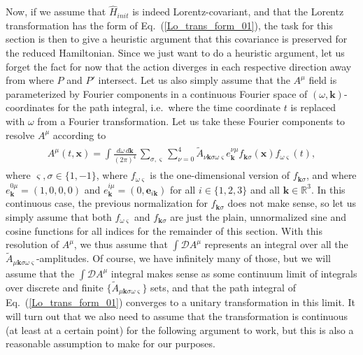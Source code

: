 \documentclass{article}
\begin{document}
Now, if we assume that $\hat H_{init}$ is indeed Lorentz-covariant, and that the Lorentz transformation has the form of Eq.\ (\ref{Lo_trans_form_01}), the task for this section is then to give a heuristic argument that this covariance is preserved for the reduced Hamiltonian. Since we just want to do a heuristic argument, let us forget the fact for now that the action diverges in each respective direction away from where $P$ and $P'$ intersect. Let us also simply assume that the $A^\mu$ field is parameterized by Fourier components in a continuous Fourier space of $(\omega, \mathbf{k})$-coordinates for the path integral, i.e.\ where the time coordinate $t$ is replaced with $\omega$ from a Fourier transformation. 
%
Let us take these Fourier components to resolve $A^\mu$ according to
\begin{align}
\begin{aligned}
	A^\mu(t, \mathbf{x}) = 
		\int \frac{d\omega\, d\mathbf{k}}{(2\pi)^4}\, 
		\sum_{\sigma, \varsigma}
		\sum_{\nu=0}^4
		\widetilde A_{\nu \mathbf{k} \sigma \omega \varsigma} 
		e_{\mathbf{k}}^{\nu \mu}
		f_{\mathbf{k} \sigma}(\mathbf{x})
		f_{\omega\varsigma}(t), 
	\label{A_mu_continuously_resolved}
\end{aligned}
\end{align}
where $\varsigma, \sigma \in \{1, -1\}$, where $f_{\omega\varsigma}$ is the one-dimensional version of $f_{\mathbf{k}\sigma}$, and where $e_{\mathbf{k}}^{0\mu} = (1,0,0,0)$ and $e_{\mathbf{k}}^{i\mu} = (0, \mathbf{e}_{i\mathbf{k}})$ for all $i\in\{1,2,3\}$ and all $\mathbf{k}\in\mathbb{R}^3$. 
In this continuous case, the previous normalization for $f_{\mathbf{k}\sigma}$ does not make sense, so let us simply assume that both $f_{\omega\varsigma}$ and $f_{\mathbf{k}\sigma}$ are just the plain, unnormalized sine and cosine functions for all indices for the remainder of this section. 
With this resolution of $A^\mu$, we thus assume that $\int \mathcal{D}A^\mu$ represents an integral over all the $\widetilde A_{\mu \mathbf{k} \sigma \omega \varsigma}$-amplitudes. Of course, we have infinitely many of those, but we will assume that the $\int \mathcal{D}A^\mu$ integral makes sense as some continuum limit of integrals over discrete and finite $\{\widetilde A_{\mu \mathbf{k} \sigma \omega \varsigma}\}$ sets, and that the path integral of Eq.\ (\ref{Lo_trans_form_01}) converges to a unitary transformation in this limit. It will turn out that we also need to assume that the transformation is continuous (at least at a certain point) for the following argument to work, but this is also a reasonable assumption to make for our purposes. 
\end{document}
